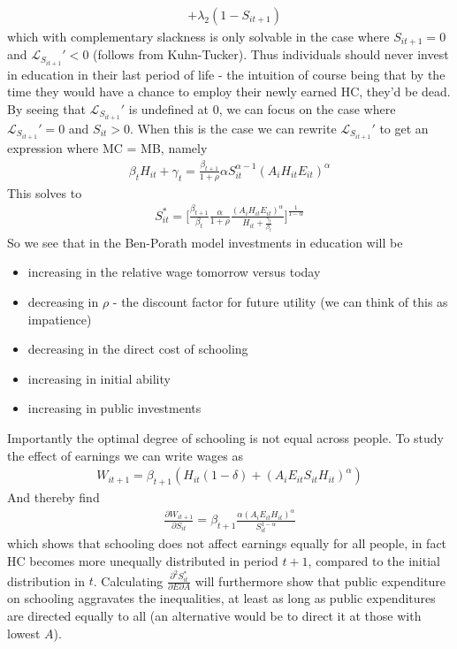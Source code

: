 \documentclass[12pt, a4paper]{article}
\begin{document}
\begin{multicols}{2}
\begin{align*}
&+\lambda_2(1- S_{it+1})
\end{align*}
which with complementary slackness is only solvable in the case where $S_{it+1}=0$ and $\mathcal{L}_{S_{it+1}}'<0$ (follows from Kuhn-Tucker). Thus individuals should never invest in education in their last period of life - the intuition of course being that by the time they would have a chance to employ their newly earned HC, they'd be dead. By seeing that $\mathcal{L}_{S_{it+1}}'$ is undefined at 0, we can focus on the case where $\mathcal{L}_{S_{it+1}}'=0$ and $S_{it}>0$. When this is the case we can rewrite $\mathcal{L}_{S_{it+1}}'$ to get an expression where MC = MB, namely
\begin{align*}
 \beta_t H_{it} + \gamma_t = \frac{\beta_{t+1}}{1+ \rho} \alpha S_{it}^{\alpha-1}(A_iH_{it}E_{it})^{\alpha}
\end{align*}
This solves to 
\begin{align*}
S_{it}^* = \bigg[ \frac{\beta_{t+1}}{\beta_t}\frac{\alpha}{1+\rho}\frac{(A_iH_{it}E_{it})^{\alpha}}{H_{it}+ \frac{\gamma_t}{\beta_t}} \bigg]^{\frac{1}{1-\alpha}}
\end{align*}
So we see that in the Ben-Porath model investments in education will be 
\begin{itemize}
\item increasing in the relative wage tomorrow versus today
\item decreasing in $\rho$ - the discount factor for future utility (we can think of this as impatience)
\item decreasing in the direct cost of schooling
\item increasing in initial ability
\item increasing in public investments
\end{itemize}
Importantly the optimal degree of schooling is not equal across people. To study the effect of earnings we can write wages as 
\begin{align*}
W_{it+1} = \beta_{t+1}(H_{it}(1-\delta)  
+ (A_i E_{it} S_{it} H_{it})^{\alpha})
\end{align*}
And thereby find 
\begin{align*}
\frac{\partial W_{it+1} }{\partial S_{it}} = \beta_{t+1} \frac{\alpha(A_i E_{it} H_{it})^{\alpha}}{S_{it}^{1- \alpha}}
\end{align*}
which shows that schooling does not affect earnings equally for all people, in fact HC becomes more unequally distributed in period $t+1$, compared to the initial distribution in $t$. Calculating $\frac{\partial^2 S_{it}^* }{\partial E \partial A}$ will furthermore show that public expenditure on schooling aggravates the inequalities, at least as long as public expenditures are directed equally to all (an alternative would be to direct it at those with lowest $A$).


\end{multicols}
\end{document}
